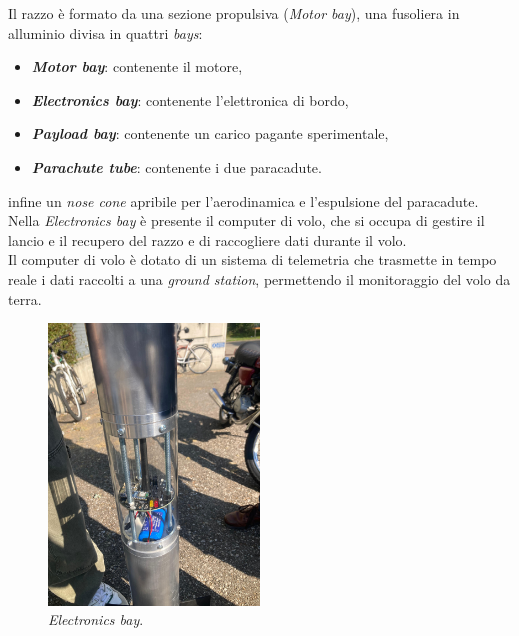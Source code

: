 \documentclass[12pt,a4paper,twoside]{book}
\begin{document}
Il razzo è formato da una sezione propulsiva (\emph{Motor bay}), una fusoliera
in alluminio divisa in quattri \emph{bays}:
\begin{itemize}
    \item \textbf{\emph{Motor bay}}: contenente il motore,
    \item \textbf{\emph{Electronics bay}}: contenente l'elettronica di bordo,
    \item \textbf{\emph{Payload bay}}: contenente un carico pagante sperimentale,
    \item \textbf{\emph{Parachute tube}}: contenente i due paracadute.
\end{itemize}
infine un \emph{nose cone} apribile per l'aerodinamica e l'espulsione del paracadute. \\

Nella \emph{Electronics bay}
è presente il computer di volo, che si occupa di
gestire il lancio e il recupero del razzo e di raccogliere dati durante il volo. \\
Il computer di volo è dotato di un sistema di telemetria che trasmette in tempo
reale i dati raccolti a una \emph{ground station}, permettendo il monitoraggio
del volo da terra.

\begin{figure}[H]
    \centering
    \includegraphics[width=0.5\textwidth]{img/electronics-bay.jpeg}
    \caption{\emph{Electronics bay}.}
    \label{fig:electronics-bay}
\end{figure}
\end{document}
